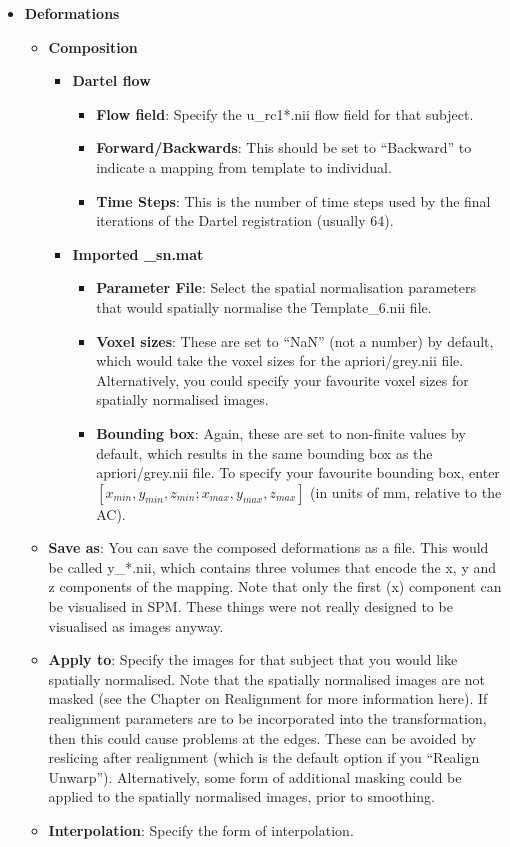 \begin{itemize}
\item{{\bf Deformations}
  \begin{itemize}
  \item{{\bf Composition}
    \begin{itemize}
    \item{{\bf Dartel flow}
      \begin{itemize}
      \item{{\bf Flow field}: Specify the u\_rc1*.nii flow field for that subject.}
      \item{{\bf Forward/Backwards}: This should be set to ``Backward'' to indicate a mapping from template to individual.}
      \item{{\bf Time Steps}: This is the number of time steps used by the final iterations of the Dartel registration (usually 64).}
      \end{itemize}
    }
    \item{{\bf Imported \_sn.mat}
      \begin{itemize}
      \item{{\bf Parameter File}: Select the spatial normalisation parameters that would spatially normalise the Template\_6.nii file.}
      \item{{\bf Voxel sizes}: These are set to ``NaN'' (not a number) by default, which would take the voxel sizes for the apriori/grey.nii file.  Alternatively, you could specify your favourite voxel sizes for spatially normalised images.}
      \item{{\bf Bounding box}: Again, these are set to non-finite values by default, which results in the same bounding box as the apriori/grey.nii file.  To specify your favourite bounding box, enter $[x_{min}, y_{min}, z_{min}; x_{max}, y_{max}, z_{max}]$ (in units of mm, relative to the AC).}
      \end{itemize}
    }
    \end{itemize}
  }
  \item{{\bf Save as}: You can save the composed deformations as a file. This would be called y\_*.nii, which contains three volumes that encode the x, y and z components of the mapping.  Note that only the first (x) component can be visualised in SPM. These things were not really designed to be visualised as images anyway.}
  \item{{\bf Apply to}: Specify the images for that subject that you would like spatially normalised. Note that the spatially normalised images are not masked (see the Chapter on Realignment for more information here).  If realignment parameters are to be incorporated into the transformation, then this could cause problems at the edges.  These can be avoided by reslicing after realignment (which is the default option if you ``Realign Unwarp'').  Alternatively, some form of additional masking  could be applied to the spatially normalised images, prior to smoothing.}
  \item{{\bf Interpolation}: Specify the form of interpolation.}
  \end{itemize}
}
\end{itemize}

